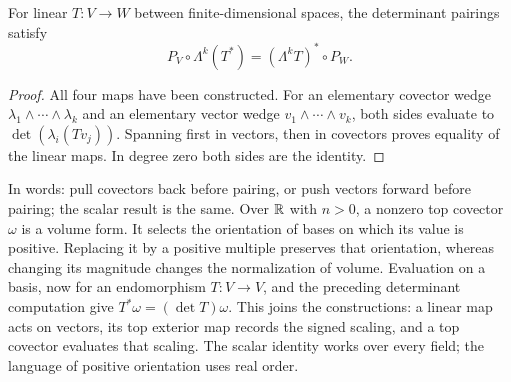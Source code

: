 \begin{proposition}
For linear $T:V\to W$ between finite-dimensional spaces, the determinant
pairings satisfy
\[
P_V\circ\Lambda^k(T^*)=(\Lambda^kT)^*\circ P_W.
\]
\end{proposition}
\begin{proof}
All four maps have been constructed. For an elementary covector wedge
$\lambda_1\wedge\cdots\wedge\lambda_k$ and an elementary vector wedge
$v_1\wedge\cdots\wedge v_k$, both sides evaluate to
$\det(\lambda_i(Tv_j))$. Spanning first in vectors, then in covectors
proves equality of the linear maps. In degree zero both sides are the identity.
\end{proof}
In words: pull covectors back before pairing, or push vectors forward before
pairing; the scalar result is the same.
Over $\mathbb{R}$ with $n>0$, a nonzero top covector $\omega$ is a volume form.
It selects the orientation of bases on which its value is positive.
Replacing it by a positive multiple preserves that orientation, whereas
changing its magnitude changes the normalization of volume. Evaluation
on a basis, now for an endomorphism $T:V\to V$, and the preceding determinant computation give
$T^*\omega=(\det T)\omega$. This joins the constructions: a linear map
acts on vectors, its top exterior map records the signed scaling, and a
top covector evaluates that scaling. The scalar identity works over every
field; the language of positive orientation uses real order.

